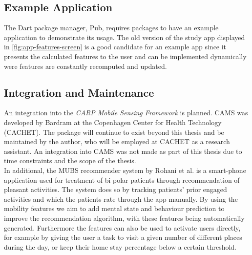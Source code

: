 \subsection{Example Application}
The Dart package manager, Pub, requires packages to have an example application to demonstrate its usage. The old version of the study app displayed in \ref{fig:app-features-screen} is a good candidate for an example app since it presents the calculated features to the user and can be implemented dynamically were features are constantly recomputed and updated.

\subsection{Integration and Maintenance}
An integration into the \textit{CARP Mobile Sensing Framework} is planned. CAMS was developed by Bardram \cite{CAMS} at the Copenhagen Center for Health Technology (CACHET). The package will continue to exist beyond this thesis and  be maintained by the author, who will be employed at CACHET as a research assistant. An integration into CAMS was not made as part of this thesis due to time constraints and the scope of the thesis. \\

In additional, the MUBS recommender system by Rohani et al. \cite{mubs-rohani} is a smart-phone application used for treatment of bi-polar patients through recommendation of pleasant activities. The system does so by tracking patients' prior engaged activities and which the patients rate through the app manually. By using the mobility features we aim to add mental state and behaviour prediction to improve the recommendation algorithm, with these features being automatically generated. Furthermore the features can also be used to activate users directly, for example by giving the user a task to visit a given number of different places during the day, or keep their home stay percentage below a certain threshold.